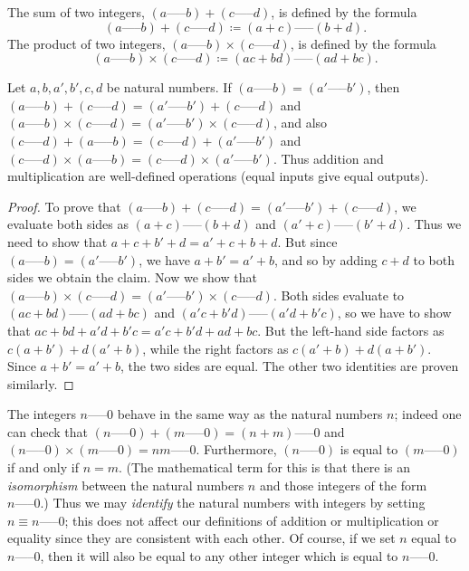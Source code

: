 \begin{definition}\label{definition 4.1.2}
The sum of two integers, \((a \text{-----} b) + (c \text{-----} d)\), is defined by the formula
\[
    (a \text{-----} b) + (c \text{-----} d) \coloneqq (a + c) \text{-----} (b + d).
\]
The product of two integers, \((a \text{-----} b) \times (c \text{-----} d)\), is defined by the formula
\[
    (a \text{-----} b) \times (c \text{-----} d) \coloneqq (ac + bd) \text{-----} (ad + bc).
\]
\end{definition}

\begin{lemma}\label{lemma 4.1.2}
Let \(a, b, a', b', c, d\) be natural numbers.
If \((a \text{-----} b) = (a' \text{-----} b')\), then \((a \text{-----} b) + (c \text{-----} d) = (a' \text{-----} b') + (c \text{-----} d)\) and \((a \text{-----} b) \times (c \text{-----} d) = (a' \text{-----} b') \times (c \text{-----} d)\), and also \((c \text{-----} d) + (a \text{-----} b) = (c \text{-----} d) + (a' \text{-----} b')\) and \((c \text{-----} d) \times (a \text{-----} b) = (c \text{-----} d) \times (a' \text{-----} b')\).
Thus addition and multiplication are well-defined operations (equal inputs give equal outputs).
\end{lemma}

\begin{proof}
To prove that \((a \text{-----} b) + (c \text{-----} d) = (a' \text{-----} b') + (c \text{-----} d)\), we evaluate both sides as \((a + c) \text{-----} (b + d)\) and \((a' + c) \text{-----} (b' + d)\).
Thus we need to show that \(a + c + b' + d = a' + c + b + d\).
But since \((a \text{-----} b) = (a' \text{-----} b')\), we have \(a + b' = a' + b\), and so by adding \(c + d\) to both sides we obtain the claim.
Now we show that \((a \text{-----} b) \times (c \text{-----} d) = (a' \text{-----} b') \times (c \text{-----} d)\).
Both sides evaluate to \((ac + bd) \text{-----} (ad + bc)\) and \((a'c + b'd) \text{-----} (a'd + b'c)\), so we have to show that \(ac + bd + a'd + b'c = a'c + b'd + ad + bc\).
But the left-hand side factors as \(c(a + b') + d(a' + b)\), while the right factors as \(c(a' + b) + d(a + b')\).
Since \(a + b' = a' + b\), the two sides are equal.
The other two identities are proven similarly.
\end{proof}

The integers \(n \text{-----} 0\) behave in the same way as the natural numbers \(n\);
indeed one can check that \((n \text{-----} 0) + (m \text{-----} 0) = (n + m) \text{-----} 0\) and \((n \text{-----} 0) \times (m \text{-----} 0) = nm \text{-----} 0\).
Furthermore, \((n \text{-----} 0)\) is equal to \((m \text{-----} 0)\) if and only if \(n = m\).
(The mathematical term for this is that there is an \emph{isomorphism} between the natural numbers \(n\) and those integers of the form \(n \text{-----} 0\).)
Thus we may \emph{identify} the natural numbers with integers by setting \(n \equiv n \text{-----} 0\);
this does not affect our definitions of addition or multiplication or equality since they are consistent with each other.
Of course, if we set \(n\) equal to \(n \text{-----} 0\), then it will also be equal to any other integer which is equal to \(n \text{-----} 0\).

